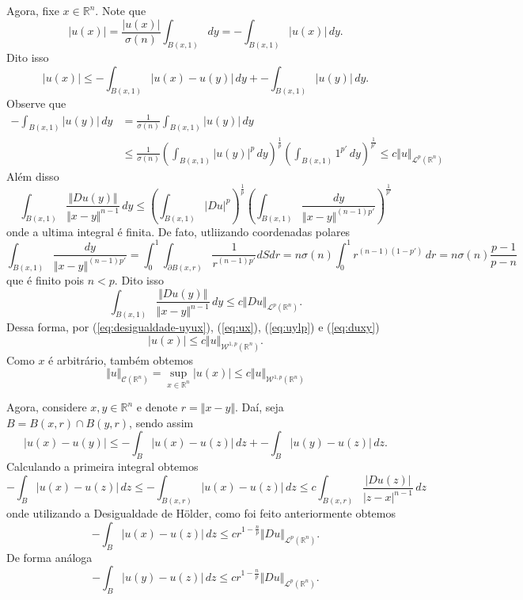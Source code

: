 \documentclass[a4paper, 11pt]{book}
\theoremstyle{definition}
\newcommand{\bR}{\mathbb{R}}
\newcommand{\cC}{\mathcal{C}}
\newcommand{\cL}{\mathcal{L}}
\newcommand{\cW}{\mathcal{W}}
\newcommand{\sint}{-\!\!\!\!\!\!\int}
\begin{document}
\begin{prf}
    Agora, fixe $x \in \bR^n$. Note que
    \[
        |u(x)| = \frac{|u(x)|}{\sigma(n)}\int_{B(x,1)} dy = \sint_{B(x,1)} |u(x)| \,dy.
    \]
    Dito isso
    \begin{equation} \label{eq:ux}
        |u(x)| \leqslant \sint_{B(x,1)} |u(x) - u(y)| \,dy + \sint_{B(x,1)} |u(y)|\,dy.
    \end{equation}
    Observe que
    \begin{equation} \label{eq:uylp}
        \begin{aligned}
            \sint_{B(x,1)} |u(y)| \,dy &= \frac{1}{\sigma(n)} \int_{B(x,1)} |u(y)| \,dy\\ 
            &\leqslant \frac{1}{\sigma(n)} \left( \int_{B(x,1)} |u(y)|^p\,dy \right)^{\frac{1}{p}} \left( \int_{B(x,1)} 1^{p'} \,dy \right)^{\frac{1}{p'}} \leqslant c \Vert u \Vert_{\cL^p(\bR^n)}
        \end{aligned}
    \end{equation}
    Além disso
    \[
        \int_{B(x,1)} \frac{\Vert Du(y) \Vert}{\Vert x - y \Vert^{n-1}} \,dy \leqslant \left( \int_{B(x,1)} |Du|^p \right)^{\frac{1}{p}} \left( \int_{B(x,1)} \frac{dy}{\Vert x - y \Vert^{(n-1)p'}} \right)^{\frac{1}{p'}}
    \]
    onde a ultima integral é finita.
    De fato, utliizando coordenadas polares
    \[
        \int_{B(x,1)} \frac{dy}{\Vert x - y \Vert^{(n-1)p'}} = \int_0^1 \int_{\partial B(x,r)} \frac{1}{r^{(n-1)p'}} dSdr = n\sigma(n)\int_0^1 r^{(n-1)(1-p')} \,dr = n \sigma(n)  \frac{p-1}{p-n}
    \]
    que é finito pois $n < p$.
    Dito isso
    \begin{equation} \label{eq:duxy}
        \int_{B(x,1)} \frac{\Vert Du(y) \Vert}{\Vert x - y \Vert^{n-1}} \,dy \leqslant c\Vert Du \Vert_{\cL^p(\bR^n)}.
    \end{equation}
    Dessa forma, por (\ref{eq:desigualdade-uyux}), (\ref{eq:ux}), (\ref{eq:uylp}) e (\ref{eq:duxy})
    \[
        |u(x)| \leqslant c \Vert u \Vert_{\cW^{1,p}(\bR^n)}.
    \]
    Como $x$ é arbitrário, também obtemos
    \begin{equation} \label{eq:normac}
        \Vert u \Vert_{\cC(\bR^n)} = \sup_{x \in \bR^n} |u(x)| \leqslant c \Vert u \Vert_{\cW^{1,p}(\bR^n)}
    \end{equation}

    Agora, considere $x, y \in \bR^n$ e denote $r = \Vert x - y \Vert$. Daí, seja $B = B(x,r) \cap B(y,r)$, sendo assim
    \[
        |u(x) - u(y)| \leqslant \sint_{B} |u(x) - u(z)| \,dz + \sint_B |u(y) - u(z)| \,dz.
    \]
    Calculando a primeira integral obtemos
    \[
        \sint_B |u(x) - u(z)| \,dz \leqslant \sint_{B(x,r)} |u(x) - u(z)| \,dz \leqslant c \int_{B(x,r)} \frac{|Du(z)|}{|z-x|^{n-1}} \,dz
    \]
    onde utilizando a Desigualdade de Hölder, como foi feito anteriormente obtemos
    \[
        \sint_B |u(x) - u(z)| \,dz \leqslant cr^{1 - \frac{n}{p}} \Vert Du \Vert_{\cL^p(\bR^n)}.
    \]
    De forma análoga
    \[
        \sint_B |u(y) - u(z)| \,dz \leqslant cr^{1 - \frac{n}{p}} \Vert Du \Vert_{\cL^p(\bR^n)}.
    \]


\end{prf}
\end{document}

